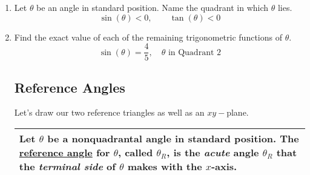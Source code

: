 \begin{enumerate}
\item Let $\theta$ be an angle in standard position.  Name the quadrant in which $\theta$ lies.
$$\sin(\theta)<0, \quad \quad \tan(\theta)<0$$


\newpage

\item Find the exact value of each of the remaining trigonometric functions of $\theta$.
$$\sin(\theta)=\frac{4}{5}, \quad  \theta \text{ in Quadrant 2}$$\vfill


\subsection{Reference Angles}

Let's draw our two reference triangles as well as an $xy-$plane.\\[1.5in]
\hspace{-.3in}
\begin{tabular}{| p{} |} \hline
  Let $\theta$ be a
  nonquadrantal angle in standard position.  The \underline{reference
  angle} for $\theta$, called $\theta_R$, is the \emph{acute} angle
  $\theta_R$ that the \emph{terminal side} of $\theta$ makes with the
  $x$-axis. \\ \hline
\end{tabular}


\end{enumerate}
